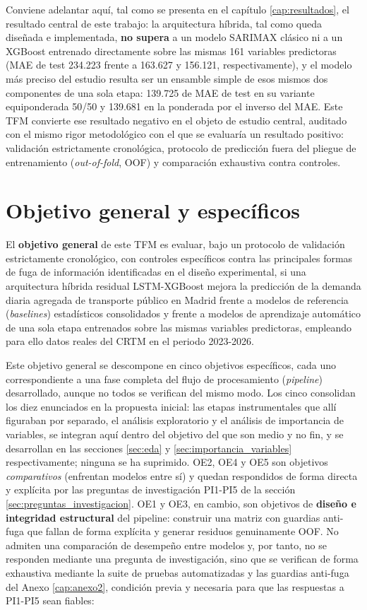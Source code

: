 Conviene adelantar aquí, tal como se presenta en el capítulo \ref{cap:resultados}, el
resultado central de este trabajo: la arquitectura híbrida, tal como queda diseñada e
implementada, \textbf{no supera} a un modelo SARIMAX clásico ni a un XGBoost entrenado
directamente sobre las mismas 161 variables predictoras (MAE de test 234.223 frente a
163.627 y 156.121, respectivamente), y el modelo más preciso del estudio resulta ser un
ensamble simple de esos mismos dos componentes de una sola etapa: 139.725 de MAE de test
en su variante equiponderada 50/50 y 139.681 en la ponderada por el inverso del MAE. Este
TFM convierte ese resultado negativo en el objeto de estudio central, auditado con el
mismo rigor metodológico con el que se evaluaría un resultado positivo: validación
estrictamente cronológica, protocolo de predicción fuera del pliegue de entrenamiento
(\emph{out-of-fold}, OOF) y comparación exhaustiva contra controles.

\section{Objetivo general y específicos}\label{sec:objetivos}

El \textbf{objetivo general} de este TFM es evaluar, bajo un protocolo de validación
estrictamente cronológico, con controles específicos contra las principales formas de
fuga de información identificadas en el diseño experimental, si una arquitectura híbrida
residual LSTM-XGBoost mejora la predicción de la demanda diaria agregada de transporte
público en Madrid frente a modelos de referencia (\emph{baselines}) estadísticos consolidados y frente a modelos de
aprendizaje automático de una sola etapa entrenados sobre las mismas variables
predictoras, empleando para ello datos reales del CRTM en el periodo 2023-2026.

Este objetivo general se descompone en cinco objetivos específicos, cada uno
correspondiente a una fase completa del flujo de procesamiento (\emph{pipeline})
desarrollado, aunque no todos se verifican del mismo modo. Los cinco consolidan los diez
enunciados en la propuesta inicial: las etapas instrumentales que allí figuraban por
separado, el análisis exploratorio y el análisis de importancia de variables, se integran
aquí dentro del objetivo del que son medio y no fin, y se desarrollan en las secciones
\ref{sec:eda} y \ref{sec:importancia_variables} respectivamente; ninguna se ha suprimido.
OE2, OE4 y OE5 son objetivos \emph{comparativos} (enfrentan modelos entre sí) y quedan
respondidos de forma directa y explícita por las preguntas de investigación PI1-PI5 de la
sección \ref{sec:preguntas_investigacion}. OE1 y OE3, en cambio, son objetivos de
\textbf{diseño e integridad estructural} del pipeline: construir una matriz con guardias
anti-fuga que fallan de forma explícita y generar residuos genuinamente OOF. No admiten
una comparación de desempeño entre modelos y, por tanto, no se responden mediante una
pregunta de investigación, sino que se verifican de forma exhaustiva mediante la suite de
pruebas automatizadas y las guardias anti-fuga del Anexo \ref{cap:anexo2}, condición
previa y necesaria para que las respuestas a PI1-PI5 sean fiables:

